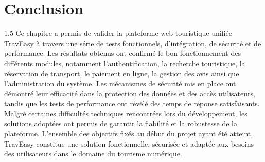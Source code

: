 \documentclass[a4paper,12pt]{report}
\begin{document}

\section{Conclusion}
\vspace{0.5cm}
\begin{spacing}{1.5}
\justifying
Ce chapitre a permis de valider la plateforme web touristique unifiée TravEasy à travers une série de tests fonctionnels, d'intégration, de sécurité et de performance. Les résultats obtenus ont confirmé le bon fonctionnement des différents modules, notamment l'authentification, la recherche touristique, la réservation de transport, le paiement en ligne, la gestion des avis ainsi que l'administration du système. Les mécanismes de sécurité mis en place ont démontré leur efficacité dans la protection des données et des accès utilisateurs, tandis que les tests de performance ont révélé des temps de réponse satisfaisants. Malgré certaines difficultés techniques rencontrées lors du développement, les solutions adoptées ont permis de garantir la fiabilité et la robustesse de la plateforme. L'ensemble des objectifs fixés au début du projet ayant été atteint, TravEasy constitue une solution fonctionnelle, sécurisée et adaptée aux besoins des utilisateurs dans le domaine du tourisme numérique.

\end{spacing}




\newpage
\end{document}
